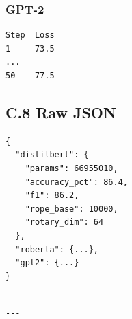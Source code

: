 \subsubsection{GPT-2}
\begin{lstlisting}
Step  Loss
1     73.5
...
50    77.5
\end{lstlisting}

\subsection{C.8 Raw JSON}

\begin{lstlisting}
{
  "distilbert": {
    "params": 66955010,
    "accuracy_pct": 86.4,
    "f1": 86.2,
    "rope_base": 10000,
    "rotary_dim": 64
  },
  "roberta": {...},
  "gpt2": {...}
}
\end{lstlisting}
\begin{lstlisting}

---
\end{lstlisting}